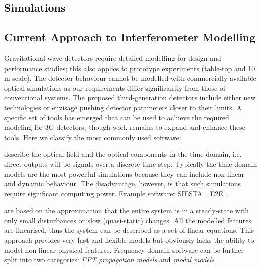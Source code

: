 \begin{samepage} %

\section{Simulations}
\subsection{Current Approach to Interferometer Modelling}
Gravitational-wave detectors require detailed modelling for design and performance studies; this also applies 
to prototype experiments (table-top and 10\,m scale). 
The detector behaviour cannot be modelled with commercially available optical simulations as our requirements differ significantly from those of conventional systems. 
The proposed third-generation detectors include either new technologies or envisage pushing detector parameters closer to their limits. 
A specific set of tools has emerged that can be used to achieve the required modeling for \ac{3G}  detectors, though work remains to expand and enhance these tools. Here we classify the most commonly used software:

 describe the optical field and the optical components in the time domain, i.e. direct outputs will be signals over a discrete time step. Typically the time-domain models are the most powerful   simulations because they can include non-linear and dynamic behaviour.
The disadvantage, however, is that such simulations require significant computing power. Example software: SIESTA~\cite{SIESTA}, E2E~\cite{e2e_2000}.


 are based on the approximation that the entire system is in a steady-state with only small disturbances or slow (quasi-static) changes. All the modelled features are linearised, thus the system can be described as a set of linear equations. 
This approach provides very fast and flexible models but obviously lacks the ability to model non-linear physical features. Frequency domain software can be further split into two categories: \emph{\ac{FFT} propagation models} and \emph{modal models}.

\end{samepage} %

